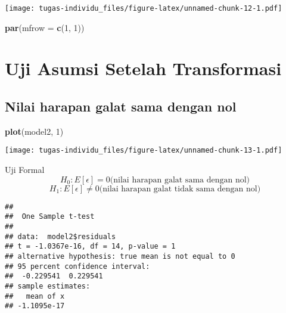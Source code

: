 \documentclass[
]{article}
\newenvironment{Shaded}{\begin{snugshade}}{\end{snugshade}}
\newcommand{\AttributeTok}[1]{\textcolor[rgb]{0.13,0.29,0.53}{#1}}
\newcommand{\DecValTok}[1]{\textcolor[rgb]{0.00,0.00,0.81}{#1}}
\newcommand{\FloatTok}[1]{\textcolor[rgb]{0.00,0.00,0.81}{#1}}
\newcommand{\FunctionTok}[1]{\textcolor[rgb]{0.13,0.29,0.53}{\textbf{#1}}}
\newcommand{\NormalTok}[1]{#1}
\newcommand{\SpecialCharTok}[1]{\textcolor[rgb]{0.81,0.36,0.00}{\textbf{#1}}}
\begin{document}
\texttt{[image: tugas-individu\_files/figure-latex/unnamed-chunk-12-1.pdf]}

\begin{Shaded}
\begin{Highlighting}[]
\FunctionTok{par}\NormalTok{(}\AttributeTok{mfrow =} \FunctionTok{c}\NormalTok{(}\DecValTok{1}\NormalTok{, }\DecValTok{1}\NormalTok{))}
\end{Highlighting}
\end{Shaded}

\hypertarget{uji-asumsi-setelah-transformasi}{%
\section{Uji Asumsi Setelah
Transformasi}\label{uji-asumsi-setelah-transformasi}}

\hypertarget{nilai-harapan-galat-sama-dengan-nol}{%
\subsection{Nilai harapan galat sama dengan
nol}\label{nilai-harapan-galat-sama-dengan-nol}}

\begin{Shaded}
\begin{Highlighting}[]
\FunctionTok{plot}\NormalTok{(model2, }\DecValTok{1}\NormalTok{)}
\end{Highlighting}
\end{Shaded}

\texttt{[image: tugas-individu\_files/figure-latex/unnamed-chunk-13-1.pdf]}

Uji Formal
\[H_0: E[\epsilon] = 0 \text{(nilai harapan galat sama dengan nol)}\]
\[H_1: E[\epsilon] \neq 0 \text{(nilai harapan galat tidak sama dengan nol)}\]

\begin{Shaded}
\end{Shaded}

\begin{verbatim}
## 
##  One Sample t-test
## 
## data:  model2$residuals
## t = -1.0367e-16, df = 14, p-value = 1
## alternative hypothesis: true mean is not equal to 0
## 95 percent confidence interval:
##  -0.229541  0.229541
## sample estimates:
##   mean of x 
## -1.1095e-17
\end{verbatim}
\end{document}
